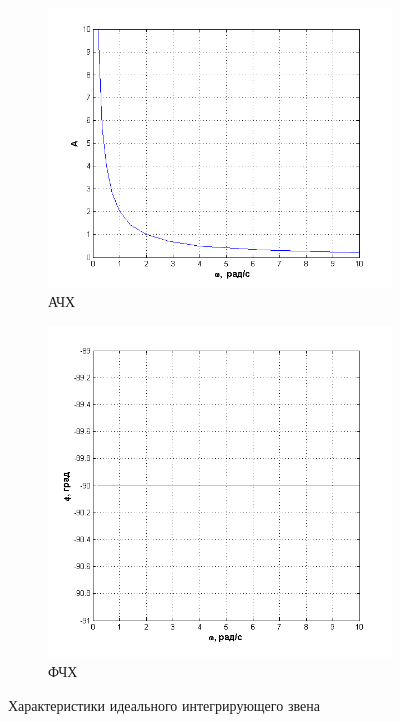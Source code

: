 \documentclass[a4paper, 11pt, russian]{article}
\begin{document}
\begin{figure}[ht!]
        \begin{subfigure}[h]{0.49\textwidth}\ContinuedFloat
            \includegraphics[width = \textwidth]{integratingLinkAFR}
            \caption{АЧХ}
        \end{subfigure}
        \hfill
        \begin{subfigure}[h]{0.49\textwidth}
            \includegraphics[width = \textwidth]{integratingLinkPFR}
            \caption{ФЧХ}
        \end{subfigure}
        \caption{Характеристики идеального интегрирующего звена}
    \end{figure}
    \clearpage
\end{document}
